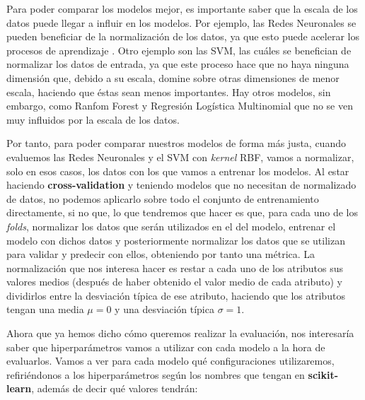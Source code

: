 \documentclass[11pt,a4paper]{article}
\begin{document}
Para poder comparar los modelos mejor, es importante saber que la escala de los datos puede llegar a influir en los modelos. Por ejemplo,
las Redes Neuronales se pueden beneficiar de la normalización de los datos, ya que esto puede acelerar los procesos de aprendizaje
\cite{bib:normalize}. Otro ejemplo son las SVM, las cuáles se benefician de normalizar los datos de entrada, ya que este proceso hace
que no haya ninguna dimensión que, debido a su escala, domine sobre otras dimensiones de menor escala, haciendo que éstas sean menos importantes.
Hay otros modelos, sin embargo, como Ranfom Forest y Regresión Logística Multinomial que no se ven muy influidos por la escala de los datos.

Por tanto, para poder comparar nuestros modelos de forma más justa, cuando evaluemos las Redes Neuronales y el SVM con \textit{kernel} RBF, vamos
a normalizar, solo en esos casos, los datos con los que vamos a entrenar los modelos. Al estar haciendo \textbf{cross-validation} y teniendo
modelos que no necesitan de normalizado de datos, no podemos aplicarlo sobre todo el conjunto de entrenamiento directamente, si no que, lo que
tendremos que hacer es que, para cada uno de los \textit{folds}, normalizar los datos que serán utilizados en el del modelo, entrenar el modelo
con dichos datos y posteriormente normalizar los datos que se utilizan para validar y predecir con ellos, obteniendo por tanto una métrica.
La normalización que nos interesa hacer es restar a cada uno de los atributos sus valores medios (después de haber obtenido el valor medio de
cada atributo) y dividirlos entre la desviación típica de ese atributo, haciendo que los atributos tengan una media $\mu = 0$ y una desviación
típica $\sigma = 1$.

Ahora que ya hemos dicho cómo queremos realizar la evaluación, nos interesaría saber que hiperparámetros vamos a utilizar con cada modelo a la
hora de evaluarlos. Vamos a ver para cada modelo qué configuraciones utilizaremos, refiriéndonos a los hiperparámetros según los nombres que
tengan en \textbf{scikit-learn}, además de decir qué valores tendrán:
\end{document}

